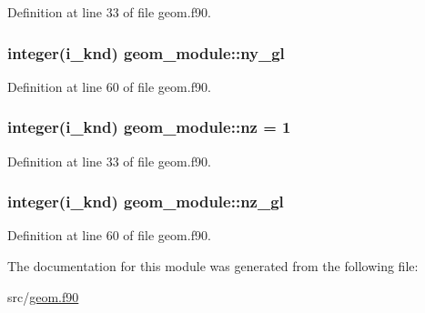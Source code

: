 Definition at line 33 of file geom.\-f90.

\hypertarget{classgeom__module_a28abec0d4fe709bc64ee36b68347ce1a}{
\subsubsection[{ny\-\_\-gl}]{\setlength{\rightskip}{0pt plus 5cm}integer(i\-\_\-knd) geom\-\_\-module\-::ny\-\_\-gl}}\label{classgeom__module_a28abec0d4fe709bc64ee36b68347ce1a}


Definition at line 60 of file geom.\-f90.

\hypertarget{classgeom__module_a5f461a2f10c78de302a44c8c70b8fca5}{
\subsubsection[{nz}]{\setlength{\rightskip}{0pt plus 5cm}integer(i\-\_\-knd) geom\-\_\-module\-::nz = 1}}\label{classgeom__module_a5f461a2f10c78de302a44c8c70b8fca5}


Definition at line 33 of file geom.\-f90.

\hypertarget{classgeom__module_a3d237cf21a21064504566ce34b27c848}{
\subsubsection[{nz\-\_\-gl}]{\setlength{\rightskip}{0pt plus 5cm}integer(i\-\_\-knd) geom\-\_\-module\-::nz\-\_\-gl}}\label{classgeom__module_a3d237cf21a21064504566ce34b27c848}


Definition at line 60 of file geom.\-f90.



The documentation for this module was generated from the following file\-:\begin{DoxyCompactItemize}
\item 
src/\hyperlink{geom_8f90}{geom.\-f90}\end{DoxyCompactItemize}
